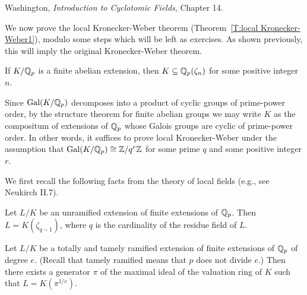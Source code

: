 %
%
%
%
%
%
%

 Washington, \textit{Introduction to Cyclotomic Fields},
Chapter 14.

\medskip

We now prove the local Kronecker-Weber theorem
(Theorem~\ref{T:local Kronecker-Weber1}), modulo some steps
which will be left as exercises. As shown previously, this will imply
the original Kronecker-Weber theorem.
\begin{theorem} \label{T:local Kronecker-Weber2}
If $K/\mathbb{Q}_p$ is a finite abelian extension, then
$K \subseteq \mathbb{Q}_p(\zeta_n)$ for some positive integer $n$.
\end{theorem}

Since $\operatorname{Gal}(K/\mathbb{Q}_p)$ decomposes into a product of cyclic groups of 
prime-power order, by the structure theorem for finite abelian groups
we may write $K$ as the compositum of extensions of $\mathbb{Q}_p$ whose Galois
groups are cyclic of prime-power order. In other words, it suffices to prove
local Kronecker-Weber under the assumption that $\operatorname{Gal}(K/\mathbb{Q}_p) \cong
\mathbb{Z}/q^r \mathbb{Z}$ for some prime $q$ and some positive integer $r$.

We first recall the following facts from the theory of local fields
(e.g., see Neukirch II.7).
\begin{lemma} \label{lem:unram}
Let $L/K$ be an unramified extension of finite extensions of $\mathbb{Q}_p$. 
Then $L = K(\zeta_{q-1})$, where $q$ is the cardinality of the residue
field of $L$.
\end{lemma}
\begin{lemma} \label{lem:tame}
Let $L/K$ be a totally and 
tamely ramified extension of finite extensions of $\mathbb{Q}_p$ of degree $e$.
(Recall that tamely ramified means that $p$ does not divide $e$.) Then
there exists a generator $\pi$ of the maximal ideal of the valuation ring
of $K$ such that $L = K(\pi^{1/e})$.
\end{lemma}

